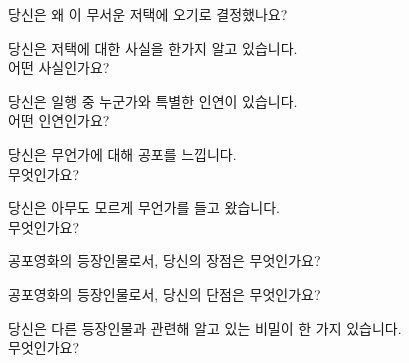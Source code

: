 \documentclass{report}
\begin{document}
	\begin{multicols}{2}
		\begin{flow}{당신은 왜 이 무서운 저택에 오기로 결정했나요?}
		\end{flow}
		
		\begin{flow}{당신은 저택에 대한 사실을 한가지 알고 있습니다. \\ 어떤 사실인가요?}
		\end{flow}
		
		\begin{flow}{당신은 일행 중 누군가와 특별한 인연이 있습니다. \\ 어떤 인연인가요?}
		\end{flow}
		
		\begin{flow}{당신은 무언가에 대해 공포를 느낍니다. \\ 무엇인가요?}
		\end{flow}
		
		\begin{flow}{당신은 아무도 모르게 무언가를 들고 왔습니다. \\ 무엇인가요?}
		\end{flow}
		
		\begin{flow}{공포영화의 등장인물로서, 당신의 장점은 무엇인가요?}
		\end{flow}
		
		\begin{flow}{공포영화의 등장인물로서, 당신의 단점은 무엇인가요?}
		\end{flow}
		
		\begin{flow}{당신은 다른 등장인물과 관련해 알고 있는 비밀이 한 가지 있습니다. \\ 무엇인가요?}
		\end{flow}
		

\end{multicols}
\end{document}
